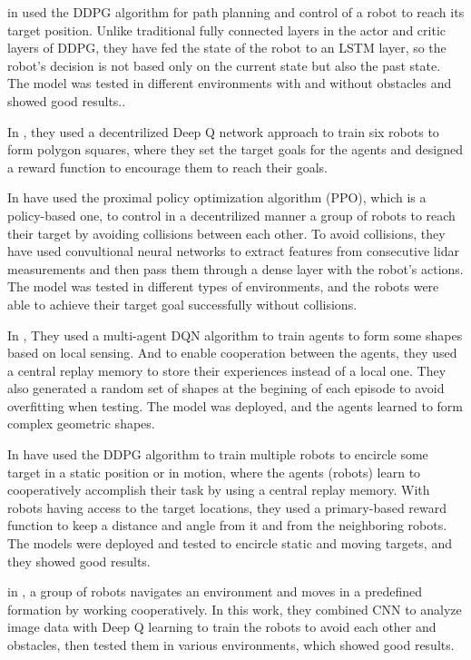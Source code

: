 \documentclass[12pt]{extarticle}
\begin{document}
in \cite{gong2022efficient} used the DDPG algorithm for path planning and control of a robot to reach its target position. Unlike traditional fully connected layers in the actor and critic layers of DDPG, they have fed the state of the robot to an LSTM layer, so the robot's decision is not based only on the current state but also the past state. The model was tested in different environments with and without obstacles and showed good results..

In \cite{prasad2017multi}, they used a decentrilized Deep Q network approach to train six robots to form polygon squares, where they set the target goals for the agents and designed a reward function to encourage them to reach their goals.



In \cite{long2018towards} have used the proximal policy optimization algorithm (PPO), which is a policy-based one, to control in a decentrilized manner a group of robots to reach their target by avoiding collisions between each other. To avoid collisions, they have used convultional neural networks to extract features from consecutive lidar measurements and then pass them through a dense layer with the robot's actions. The model was tested in different types of environments, and the robots were able to achieve their target goal successfully without collisions.

In \cite{diallo2020multi}, They used a multi-agent DQN algorithm to train agents to form some shapes based on local sensing. And to enable cooperation between the agents, they used a central replay memory to store their experiences instead of a local one. They also generated a random  set of shapes at the begining of each episode to avoid overfitting when testing.
The model was deployed, and the agents learned to form complex geometric shapes.


In \cite{ma2020multi} have used the DDPG algorithm to train multiple robots to encircle some target in a static position or in motion, where the agents (robots) learn to cooperatively accomplish their task by using a central replay memory. With robots having access to the target locations, they used a primary-based reward function to keep a distance and angle from it and from the neighboring robots. The models were deployed and tested to encircle static and moving targets, and they showed good results.


in \cite{bae2019multi}, a group of robots navigates an environment and moves in a predefined formation by working cooperatively. In this work, they combined CNN to analyze image data with Deep Q learning to train the robots to avoid each other and obstacles, then tested them in various environments, which showed good results.
\end{document}
